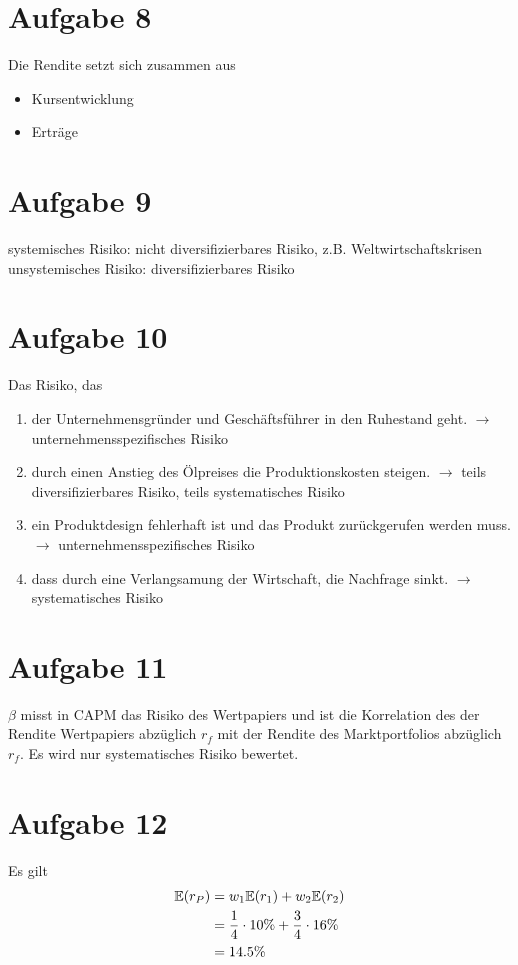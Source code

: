 \documentclass{article}
\newcommand{\E}{\mathbb{E}}
\begin{document}
	\section*{Aufgabe 8}
	Die Rendite setzt sich zusammen aus
	\begin{itemize}
		\item Kursentwicklung
		\item Erträge
	\end{itemize}
	
	\section*{Aufgabe 9}
	systemisches Risiko: nicht diversifizierbares Risiko, z.B. Weltwirtschaftskrisen \\
	unsystemisches Risiko: diversifizierbares Risiko
	
	\section*{Aufgabe 10}
	Das Risiko, das
	\begin{enumerate}[label=(\alph*)]
		\item der Unternehmensgründer und Geschäftsführer in den Ruhestand geht. $\to$ unternehmensspezifisches Risiko
		\item durch einen Anstieg des Ölpreises die Produktionskosten steigen. $\to$ teils diversifizierbares Risiko, teils systematisches Risiko
		\item ein Produktdesign fehlerhaft ist und das Produkt zurückgerufen werden muss. $\to$ unternehmensspezifisches Risiko
		\item dass durch eine Verlangsamung der Wirtschaft, die Nachfrage sinkt. $\to$ systematisches Risiko
	\end{enumerate}
	
	\section*{Aufgabe 11}
	$\beta$ misst in CAPM das Risiko des Wertpapiers und ist die Korrelation des der Rendite Wertpapiers abzüglich $r_f$ mit der Rendite des Marktportfolios abzüglich $r_f$. Es wird nur systematisches Risiko bewertet.
	
	\section*{Aufgabe 12}
	Es gilt
	\begin{align}
		\E(r_P) &= w_1\E(r_1) + w_2\E(r_2) \notag \\
		&= \frac{1}{4}\cdot 10\% + \frac{3}{4}\cdot 16\% \notag \\
		&= 14.5 \% \notag
	\end{align}
	
\end{document}
